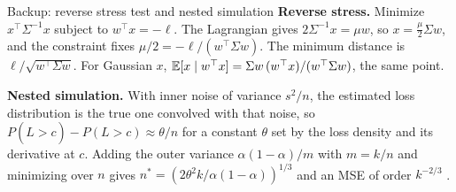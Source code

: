 \begin{frame}{Backup: reverse stress test and nested simulation}
  \small
  \textbf{Reverse stress.} Minimize $x^\top\Sigma^{-1}x$ subject to $w^\top x = -\ell$. The Lagrangian gives $2\Sigma^{-1}x = \mu w$, so $x = \tfrac{\mu}{2}\Sigma w$, and the constraint fixes $\mu/2 = -\ell/(w^\top\Sigma w)$. The minimum distance is $\ell/\sqrt{w^\top\Sigma w}$. For Gaussian $x$, $\mathbb{E}[x \mid w^\top x] = \Sigma w\,(w^\top x)/(w^\top\Sigma w)$, the same point.
  \vspace{0.4em}

  \textbf{Nested simulation.} With inner noise of variance $s^2/n$, the estimated loss distribution is the true one convolved with that noise, so $P(\hat L > c) - P(L > c) \approx \theta/n$ for a constant $\theta$ set by the loss density and its derivative at $c$. Adding the outer variance $\alpha(1-\alpha)/m$ with $m = k/n$ and minimizing over $n$ gives $n^* = (2\theta^2 k/\alpha(1-\alpha))^{1/3}$ and an MSE of order $k^{-2/3}$ \citep{gordy2010nested}.
\end{frame}
